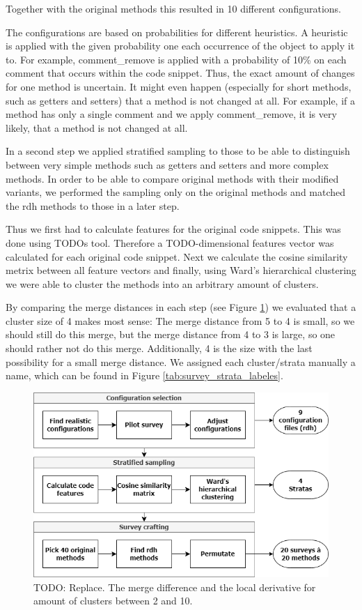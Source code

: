 \documentclass[%
class=scrreprt,
chapterprefix=false,%
open=right,%
twoside=false,%
paper=a4,%
logofile={Logo\_zentral\_farbig\_EN.png},%
thesistype=master,%
UKenglish,%
]{se2thesis}
\begin{document}
	Together with the original methods this resulted in 10 different configurations.
	
	The configurations are based on probabilities for different heuristics. A heuristic is applied with the given probability one each occurrence of the object to apply it to. For example, comment\_remove is applied with a probability of 10\% on each comment that occurs within the code snippet. Thus, the exact amount of changes for one method is uncertain. It might even happen (especially for short methods, such as getters and setters) that a method is not changed at all. For example, if a method has only a single comment and we apply comment\_remove, it is very likely, that a method is not changed at all.
	
	In a second step we applied stratified sampling to those to be able to distinguish between very simple methods such as getters and setters and more complex methods. In order to be able to compare original methods with their modified variants, we performed the sampling only on the original methods and matched the rdh methods to those in a later step.
	
	Thus we first had to calculate features for the original code snippets. This was done using TODOs tool. Therefore a TODO-dimensional features vector was calculated for each original code snippet. Next we calculate the cosine similarity metrix between all feature vectors and finally, using Ward's hierarchical clustering we were able to cluster the methods into an arbitrary amount of clusters.
	
	By comparing the merge distances in each step (see Figure \ref{fig:survey_cluster_amount}) we evaluated that a cluster size of 4 makes most sense: The merge distance from 5 to 4 is small, so we should still do this merge, but the merge distance from 4 to 3 is large, so one should rather not do this merge. Additionally, 4 is the size with the last possibility for a small merge distance. We assigned each cluster/strata manually a name, which can be found in Figure \ref{tab:survey_strata_labeles}.
	
	\begin{figure}[t]
		\centering
		\includegraphics[width=\textwidth]{img/survey_pipeline.png}
		\caption{TODO: Replace. The merge difference and the local derivative for amount of clusters between 2 and 10.} 
		\label{fig:survey_cluster_amount}
	\end{figure}
	
\end{document}
